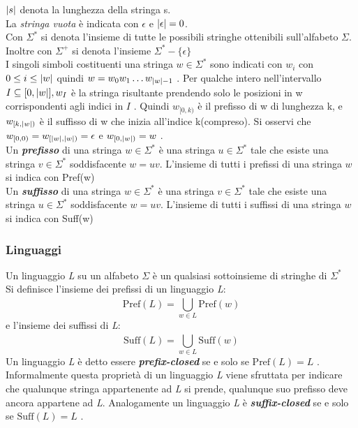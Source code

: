$\lvert s\rvert$ denota la lunghezza  della stringa s.\\
La \textit{stringa vuota} è indicata con $\epsilon$ e $\lvert\epsilon\rvert = 0$. \\
Con $\Sigma^{*}$ si denota l'insieme di tutte le possibili stringhe ottenibili sull'alfabeto $\Sigma$. Inoltre con $\Sigma^{+}$ si denota l'insieme $\Sigma^{*} - \{\epsilon\}$ \\
I singoli simboli costituenti una stringa $w \in \Sigma^{*}$ sono indicati con $w_i$ con $0 \leq i \le \lvert w\rvert$ quindi $w = w_0 w_1 \dots w_{\lvert w\rvert-1}$ . Per qualche intero nell'intervallo $I \subseteq [0,\lvert w\rvert], w_I$ è la stringa risultante prendendo solo le posizioni in w corrispondenti agli indici in $I$ . Quindi $w_{[0,k)}$ è il prefisso di w di lunghezza k, e $w_{[k,\lvert w\rvert)}$ è il suffisso di w che inizia all'indice k(compreso). Si osservi che $w_{[0,0)} = w_{[\lvert w\rvert,\lvert w\rvert)} = \epsilon$ e $w_{[0,\lvert w\rvert)} = w$ .\\
Un \textbf{\textit{prefisso}}  di una stringa $w \in \Sigma^{*}$ è una stringa $u \in \Sigma^{*}$ tale che esiste una stringa $v \in \Sigma^{*}$ soddisfacente $w=uv$. L'insieme di tutti i prefissi di una stringa $w$ si indica con Pref(w)\\
Un \textbf{\textit{suffisso}}  di una stringa $w \in \Sigma^{*}$ è una stringa $v \in \Sigma^{*}$ tale che esiste una stringa $u \in \Sigma^{*}$ soddisfacente $w=uv$. L'insieme di tutti i suffissi di una stringa $w$ si indica con Suff(w)\\

\subsubsection{Linguaggi}
Un linguaggio \textit{L} su un alfabeto $\Sigma$ è un qualsiasi sottoinsieme di stringhe di $\Sigma^{*}$\\ 
Si definisce l'insieme dei prefissi di un linguaggio \textit{L}:
\begin{equation*}
 \text{Pref}(L) = \bigcup_{w \in L}^{}{\text{Pref}(w)}
 \end{equation*}
e l'insieme dei suffissi di \textit{L}:
\begin{equation*}
 \text{Suff}(L) = \bigcup_{w \in L}^{}{\text{Suff}(w)}
 \end{equation*}
 Un linguaggio \textit{L} è detto essere \textbf{\textit{prefix-closed}} se e solo se $\text{Pref}(L) = L$ . Informalmente questa proprietà di un linguaggio \textit{L} viene sfruttata per indicare che qualunque stringa appartenente ad \textit{L} si prende, qualunque suo prefisso deve ancora appartene ad \textit{L}. Analogamente un linguaggio \textit{L} è \textbf{\textit{suffix-closed}} se e solo se $\text{Suff}(L) = L$ . \\
 
